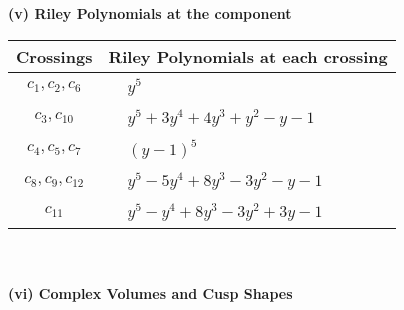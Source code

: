 \documentclass[1p]{elsarticle_modified}
\theoremstyle{definition}
\begin{document}
\newpage\renewcommand{\arraystretch}{1}
\flushleft \textbf{(v) Riley Polynomials at the component}\newline \\
\begin{tabular}{m{50pt}|m{274pt}}
Crossings & \hspace{64pt}Riley Polynomials at each crossing \\
\hline $$\begin{aligned}c_{1},c_{2},c_{6}\end{aligned}$$&$\begin{aligned}
&y^5
\end{aligned}$\\
\hline $$\begin{aligned}c_{3},c_{10}\end{aligned}$$&$\begin{aligned}
&y^5+3 y^4+4 y^3+y^2- y-1
\end{aligned}$\\
\hline $$\begin{aligned}c_{4},c_{5},c_{7}\end{aligned}$$&$\begin{aligned}
&(y-1)^5
\end{aligned}$\\
\hline $$\begin{aligned}c_{8},c_{9},c_{12}\end{aligned}$$&$\begin{aligned}
&y^5-5 y^4+8 y^3-3 y^2- y-1
\end{aligned}$\\
\hline $$\begin{aligned}c_{11}\end{aligned}$$&$\begin{aligned}
&y^5- y^4+8 y^3-3 y^2+3 y-1
\end{aligned}$\\
\hline
\end{tabular}\\~\\
\newpage\flushleft \textbf{(vi) Complex Volumes and Cusp Shapes}
\end{document}
